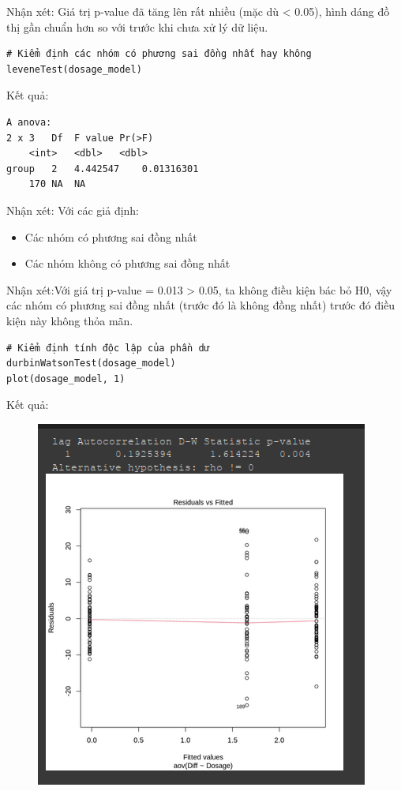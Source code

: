 \begin{itemize}
\begin{itemize}
    Nhận xét: Giá trị p-value đã tăng lên rất nhiều (mặc dù < 0.05), hình dáng đồ thị gần chuẩn hơn so với trước khi chưa xử lý dữ liệu.
   \end{itemize}
    \begin{lstlisting}
# Kiểm định các nhóm có phương sai đồng nhất hay không
leveneTest(dosage_model)
    \end{lstlisting}
    Kết quả:
    \begin{lstlisting}
A anova: 
2 x 3 	Df	F value	Pr(>F)
	<int>	<dbl>	<dbl>
group	2	4.442547	0.01316301
	170	NA	NA
    \end{lstlisting}
    Nhận xét:
    Với các giả định:
        \begin{itemize}
            \item Các nhóm có phương sai đồng nhất
            \item Các nhóm không có phương sai đồng nhất
        \end{itemize}
    Nhận xét:Với giá trị p-value = 0.013 > 0.05, ta không điều kiện bác bỏ H0, vậy các nhóm có phương sai đồng nhất (trước đó là không đồng nhất) trước đó điều kiện  này không thỏa mãn.
    \begin{lstlisting}
# Kiểm định tính độc lập của phần dư
durbinWatsonTest(dosage_model)
plot(dosage_model, 1)
    \end{lstlisting}
    Kết quả:
    \begin{figure}[H]
        \centering
        \includegraphics[width=0.8\linewidth]{part01_figures/34.png}

\end{figure}
\end{itemize}
